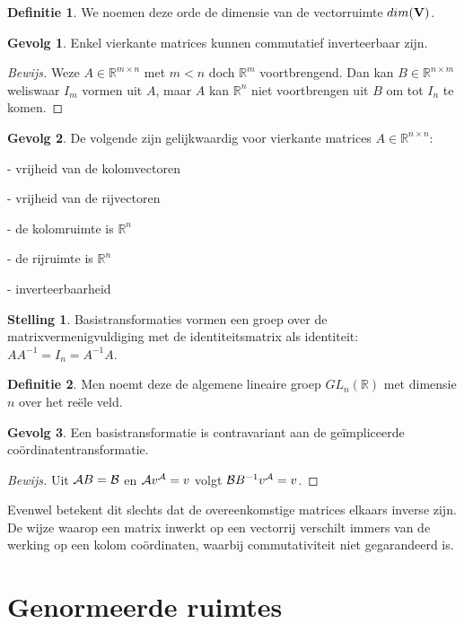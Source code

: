 \documentclass{amsart}
\theoremstyle{definition}
\newtheorem{thm}{Stelling}[section]
\newtheorem{dfn}{Definitie}[section]
\newtheorem{csq}{Gevolg}[section]
\newenvironment{bewijs}{\begin{proof}[Bewijs]}{\end{proof}}
\newcommand{\realnums}{\mathbb{R}}
\newcommand{\realn}[1][n]{\realnums^{#1}}
\newcommand{\realmx}[2][n]{\realn[#2 \times #1]}
\newcommand{\realnxn}{\realmx{n}}
\newcommand{\realmxn}{\realmx{m}}
\newcommand{\vecspace}[1][v]{\mathrm{\mathbf{\MakeUppercase#1}}}
\newcommand{\vecrow}[1][a]{\mathcal{\MakeUppercase{#1}}}
\begin{document}
\begin{dfn}
	We noemen deze orde de dimensie van de vectorruimte $dim(\vecspace)$.
\end{dfn}

\begin{csq}
	Enkel vierkante matrices kunnen commutatief inverteerbaar zijn.
	\begin{bewijs}
		Weze $A \in \realmxn$ met $m < n$ doch $\realn[m]$ voortbrengend.
		Dan kan $B \in \realmx[m]{n}$ weliswaar $I_m$ vormen uit $A$, maar $A$ kan $\realn$ niet voortbrengen uit $B$ om tot $I_n$ te komen.
	\end{bewijs}
\end{csq}

\begin{csq}
	De volgende zijn gelijkwaardig voor vierkante matrices $A \in \realnxn$:

	- vrijheid van de kolomvectoren

	- vrijheid van de rijvectoren

	- de kolomruimte is $\realn$

	- de rijruimte is $\realn$

	- inverteerbaarheid
\end{csq}

\begin{thm}
	Basistransformaties vormen een groep over de matrixvermenigvuldiging met de identiteitsmatrix als identiteit: $AA^{-1} = I_n = A^{-1}A$.
\end{thm}

\begin{dfn}
	Men noemt deze de algemene lineaire groep $GL_n(\realnums)$ met dimensie $n$ over het reële veld.
\end{dfn}

\begin{csq}
	Een basistransformatie is contravariant aan de ge\"{i}mpliceerde co\"{o}rdinatentransformatie.
	\begin{bewijs}
		Uit $\vecrow B = \vecrow[b]$ en $\vecrow v^{\vecrow}= v$ volgt $\vecrow[b] B^{-1} v^{\vecrow}= v$. 
	\end{bewijs}
	Evenwel betekent dit slechts dat de overeenkomstige matrices elkaars inverse zijn.
	De wijze waarop een matrix inwerkt op een vectorrij verschilt immers van de werking op een kolom coördinaten, waarbij commutativiteit niet gegarandeerd is.
\end{csq}

\section{Genormeerde ruimtes}
\end{document}
